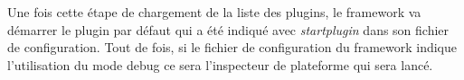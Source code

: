 \documentclass[12pt,a4paper]{article}
\begin{document}
Une fois cette étape de chargement de la liste des plugins, le framework va 
démarrer le plugin par défaut qui a été indiqué avec \emph{startplugin} dans son 
fichier de configuration. Tout de fois, si le fichier de configuration du 
framework indique l'utilisation du mode debug ce sera l'inspecteur de plateforme 
qui sera lancé.
\end{document}
